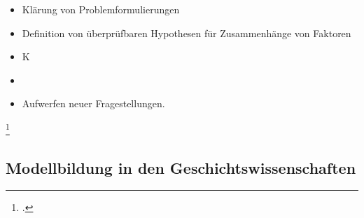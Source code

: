 \documentclass[12pt,a4paper]{article}
\begin{document}
\begin{itemize}
\item Klärung von Problemformulierungen
\item Definition von überprüfbaren Hypothesen für Zusammenhänge von Faktoren 
\item K
\item 
\item Aufwerfen neuer Fragestellungen.
\end{itemize}
\footcite[][S.182-191]{jarausch1985quantitative}

\subsection{Modellbildung in den Geschichtswissenschaften}
\end{document}
